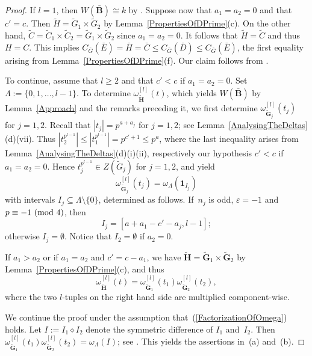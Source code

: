 \documentclass[12pt]{amsart}
\newcommand{\bG}{{\mathbf{G}}}      %
\newcommand{\bB}{{\mathbf{B}}}
\newcommand{\bH}{{\mathbf{H}}}
\theoremstyle{theorem}
\theoremstyle{definition}
\theoremstyle{remark}
\begin{document}
\begin{proof}
If $l = 1$, then $W( \bar{\bB} ) \cong k$ by \cite[Lemma~$3.6$(b)]{HL24}.
Suppose now that $a_1 = a_2 = 0$ and that $c' = c$. Then 
$\tilde{H} = \tilde{G}_1 \times \tilde{G}_2$ by
Lemma~\ref{PropertiesOfDPrime}(c). On the other hand, $\tilde{C} = 
\tilde{C}_{1} \times \tilde{C}_{2} = \tilde{G}_1 \times \tilde{G}_2$ since 
$a_1 = a_2 = 0$. It follows that $\tilde{H} = \tilde{C}$ and thus $H = C$. 
This implies $C_{\bar{G}}( \bar{E} ) = \bar{H} = 
\bar{C} \leq C_{\bar{G}}( \bar{D} ) \leq C_{\bar{G}}( \bar{E} )$, the first 
equality arising from Lemma~\ref{PropertiesOfDPrime}(f).
Our claim follows from \cite[Lemma~$3.6$(b)]{HL24}.

To continue, assume that $l \geq 2$ and that $c' < c$ if $a_1 = a_2 = 0$. 
Set $\Lambda := \{ 0, 1, \ldots , l - 1 \}$. To determine
$\omega_{\tilde{\bH}}^{[l]}( t )$, which yields $W( \bar{\bB} )$ by 
Lemma~\ref{Approach} and the remarks preceding it, we first determine 
$\omega_{\tilde{\bG}_j}^{[l]}( t_j )$ for $j = 1, 2$. Recall that 
$|t_j| = p^{a+a_j}$ for $j = 1, 2$; see Lemma~\ref{AnalysingTheDeltas}(d)(vii). 
Thus
$|t_2^{p^{l-1}}| \leq |t_1^{p^{l-1}}| = p^{c' + 1} \leq p^a$, where the last
inequality arises from Lemma~\ref{AnalysingTheDeltas}(d)(i)(ii), respectively 
our hypothesis $c' < c$ if $a_1 = a_2 = 0$. Hence
$t_j^{p^{l-1}} \in Z( \tilde{G}_j )$ for $j = 1, 2$, and 
\cite[Lemmas~$2.5.7$,~$4.1.3$]{HL25} yield
$$\omega_{\tilde{\bG}_j}^{[l]}( t_j ) = \omega_{\Lambda}( \mathbf{1}_{I_j} )$$
with intervals $I_j \subseteq \Lambda \setminus \{ 0 \}$, determined as follows.
If~$n_j$ is odd, $\varepsilon = -1$ and $p \equiv -1\,\,(\mbox{\rm mod}\,\,4)$,
then $$I_j = [a + a_1 - c' - a_j, l - 1];$$
otherwise $I_j = \emptyset$. Notice that $I_2 = \emptyset$ if $a_2 = 0$.

If $a_1 > a_2$ or if $a_1 = a_2$ and $c' = c - a_1$, we have
$\tilde{\bH} = \tilde{\bG}_1 \times \tilde{\bG}_2$ by
Lemma~\ref{PropertiesOfDPrime}(c), and thus 
\begin{equation}
\label{FactorizationOfOmega}
\omega_{\tilde{\bH}}^{[l]}( t ) = 
\omega_{\tilde{\bG}_1}^{[l]}( t_1 ) \omega_{\tilde{\bG}_2}^{[l]}( t_2 ),
\end{equation}
where the two $l$-tuples on the right hand side are multiplied component-wise.

We continue the proof under the assumption that~(\ref{FactorizationOfOmega})
holds. Let $I := I_1 \diamond I_2$ denote the symmetric difference of $I_1$ 
and~$I_2$.
Then $\omega_{\tilde{\bG}_1}^{[l]}( t_1 )\omega_{\tilde{\bG}_2}^{[l]}( t_2 )
= \omega_{\Lambda}( I )$; see \cite[Subsection~$2.2$]{HL25}.
This yields the assertions in~(a) and~(b).


\end{proof}
\end{document}
